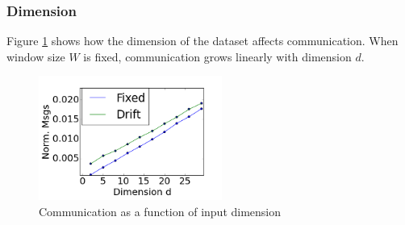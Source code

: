 \documentclass{sig-alternate-05-2015}
\begin{document}
\subsubsection{Dimension}
Figure \ref{Dimension} shows how the dimension of the dataset affects
communication.
When window size $W$ is fixed, communication grows linearly with dimension $d$.
	\begin{figure}[h]
	\centering
	\includegraphics[width=60mm]{CommunicationOfFixedVsDrift/Dimension.png}
	\caption{Communication as a function of input dimension}
	\label{Dimension}
	\end{figure}
\end{document}
